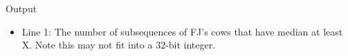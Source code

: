 Output
\begin{itemize}
	\item      Line 1: The number of subsequences of FJ's cows that have median at         least X. Note this may not fit into a 32-bit integer.    
\end{itemize}